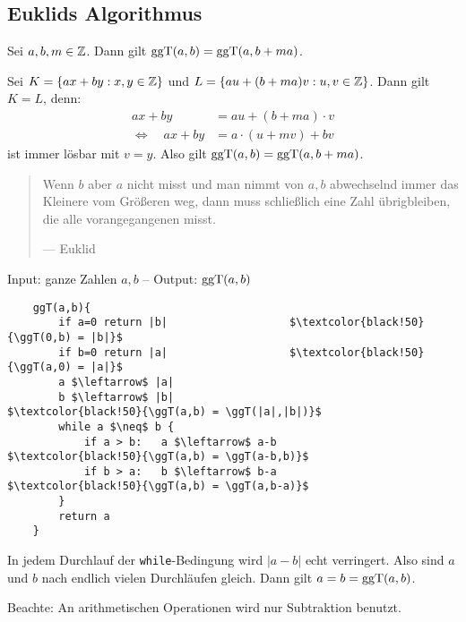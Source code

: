 	\subsection*{Euklids Algorithmus}
	\begin{lemma}
		Sei $a,b,m \in \mathbb{Z}$. \marginnote{[17]}
		Dann gilt $\operatorname{ggT}(a,b) = \operatorname{ggT}(a,b+ma)$.
	\end{lemma}

	\begin{beweis}
		Sei $K = \{ax+by : x,y \in \mathbb{Z}\}$ und $L = \{au+(b+ma)v : u,v \in \mathbb{Z}\}$.
		Dann gilt $K = L$, denn:
		\begin{align*}
			ax + by &= au + (b+ma) \cdot v \\
			\Leftrightarrow \quad ax + by &= a \cdot (u+mv) + bv
		\end{align*}
		ist immer lösbar mit $v = y$.
		Also gilt $\operatorname{ggT}(a,b) = \operatorname{ggT}(a,b+ma)$.
	\end{beweis}

	\begin{quote}
		Wenn $b$ aber $a$ nicht misst und man nimmt von $a,b$ abwechselnd immer das Kleinere vom Größeren weg, dann muss schließlich eine Zahl übrigbleiben, die alle vorangegangenen misst.
		
		{\footnotesize --- Euklid}
	\end{quote}
	\newpage
	\begin{algo}
		Input: ganze Zahlen $a,b$ -- Output: $\operatorname{ggT}(a,b)$ 
		
\begin{lstlisting}
	ggT(a,b){
		if a=0 return |b|					$\textcolor{black!50}{\ggT(0,b) = |b|}$
		if b=0 return |a|					$\textcolor{black!50}{\ggT(a,0) = |a|}$
		a $\leftarrow$ |a|
		b $\leftarrow$ |b|								$\textcolor{black!50}{\ggT(a,b) = \ggT(|a|,|b|)}$
		while a $\neq$ b {
			if a > b:	a $\leftarrow$ a-b				$\textcolor{black!50}{\ggT(a,b) = \ggT(a-b,b)}$
			if b > a:	b $\leftarrow$ b-a				$\textcolor{black!50}{\ggT(a,b) = \ggT(a,b-a)}$
		}
		return a
	}
\end{lstlisting}
		In jedem Durchlauf der \texttt{while}-Bedingung wird $|a-b|$ echt verringert.
		Also sind $a$ und $b$ nach endlich vielen Durchläufen gleich.
		Dann gilt $a=b=\operatorname{ggT}(a,b)$.
		
		Beachte: An arithmetischen Operationen wird nur Subtraktion benutzt.
	\end{algo}

